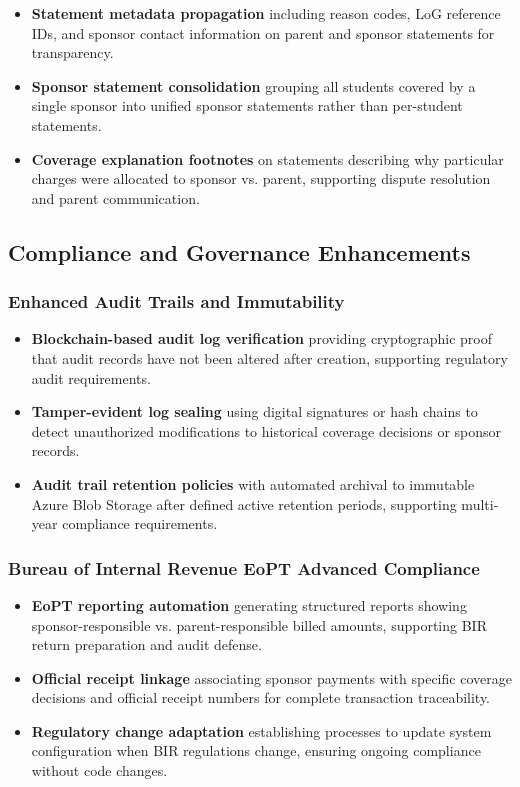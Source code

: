 \begin{itemize}
    \item \textbf{Statement metadata propagation} including reason codes, LoG reference IDs, and sponsor contact information on parent and sponsor statements for transparency.
    \item \textbf{Sponsor statement consolidation} grouping all students covered by a single sponsor into unified sponsor statements rather than per-student statements.
    \item \textbf{Coverage explanation footnotes} on statements describing why particular charges were allocated to sponsor vs. parent, supporting dispute resolution and parent communication.
\end{itemize}

\subsection{Compliance and Governance Enhancements}

\subsubsection{Enhanced Audit Trails and Immutability}

\begin{itemize}
    \item \textbf{Blockchain-based audit log verification} providing cryptographic proof that audit records have not been altered after creation, supporting regulatory audit requirements.
    \item \textbf{Tamper-evident log sealing} using digital signatures or hash chains to detect unauthorized modifications to historical coverage decisions or sponsor records.
    \item \textbf{Audit trail retention policies} with automated archival to immutable Azure Blob Storage after defined active retention periods, supporting multi-year compliance requirements.
\end{itemize}

\subsubsection{Bureau of Internal Revenue EoPT Advanced Compliance}

\begin{itemize}
    \item \textbf{EoPT reporting automation} generating structured reports showing sponsor-responsible vs. parent-responsible billed amounts, supporting BIR return preparation and audit defense.
    \item \textbf{Official receipt linkage} associating sponsor payments with specific coverage decisions and official receipt numbers for complete transaction traceability.
    \item \textbf{Regulatory change adaptation} establishing processes to update system configuration when BIR regulations change, ensuring ongoing compliance without code changes.
\end{itemize}

